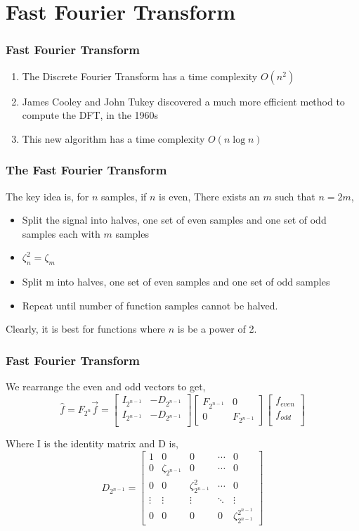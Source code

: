 \documentclass{beamer}
\begin{document}
\section{Fast Fourier Transform}
\begin{frame}
	\frametitle{Fast Fourier Transform}
	\begin{enumerate}
		\item<1-> The Discrete Fourier Transform has a time complexity $O(n^2)$
			\item<2-> James Cooley and John Tukey discovered a much more efficient method to compute the DFT, in the 1960s
			\item<3->This new algorithm has a time complexity $O(n\log{n})$
	\end{enumerate}
	
\end{frame}
\begin{frame}
	\frametitle{The Fast Fourier Transform}	
	The key idea is, for $n$ samples, if $n$ is even, There exists an $m$ such that $n = 2m$,
	\begin{itemize}
		\item<1-> Split the signal into halves, one set of even samples and one set of odd samples each with $m$ samples
		\item<2-> $\zeta_n^2 = \zeta_m$
		\item<3-> Split m into halves, one set of even samples and one set of odd samples
		\item<3-> Repeat until number of function samples cannot be halved.
	\end{itemize}
	\pause
	Clearly, it is best for functions where $n$ is be a power of 2.

\end{frame}
\begin{frame}
	\frametitle{Fast Fourier Transform}
	We rearrange the even and odd vectors to get,
\[
	\hat{f} = F_{2^n} \vec{f} = \begin{bmatrix}
		I_{2^{n-1}} & -D_{2^{n-1}} \\
		I_{2^{n-1}} & -D_{2^{n-1}} \\
	\end{bmatrix}
	\begin{bmatrix}
		F_{2^{n-1}} & 0 \\
	0 & F_{2^{n-1}}
	\end{bmatrix}
	\begin{bmatrix}
		f_{even} \\
		f_{odd} \\
	\end{bmatrix}
\]

Where I is the identity matrix and D is,
\[
		D_{2^{n-1}} = \begin{bmatrix}
		1 & 0 & 0 & \cdots & 0 \\
		0 & \zeta_{2^{n-1}} & 0 &\cdots & 0\\
		0 & 0 & \zeta_{2^{n-1}}^2 & \cdots & 0 \\
		\vdots & \vdots & \vdots  &  \ddots & \vdots \\
		0 & 0 & 0 & 0 & \zeta_{2^{n-1}}^{2^{n-1}}
	\end{bmatrix}
\]
\end{frame}
\end{document}
